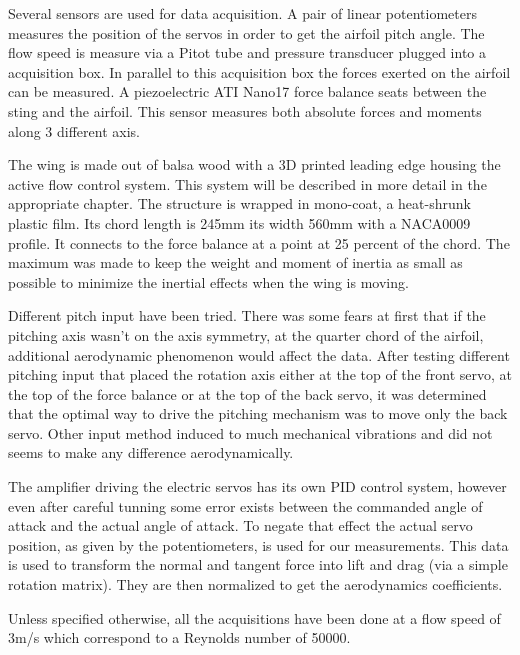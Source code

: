 \par Several sensors are used for data acquisition.
A pair of linear potentiometers measures the position of the servos in order to get the airfoil pitch angle.
The flow speed is measure via a Pitot tube and pressure transducer plugged into a acquisition box.
In parallel to this acquisition box the forces exerted on the airfoil can be measured.
A piezoelectric ATI Nano17 force balance seats between the sting and the airfoil.
This sensor measures both absolute forces and moments along 3 different axis.

\par The wing is made out of balsa wood with a 3D printed leading edge housing the active flow control system.
This system will be described in more detail in the appropriate chapter.
The structure is wrapped in mono-coat, a heat-shrunk plastic film.
Its chord length is 245mm its width 560mm with a NACA0009 profile.
It connects to the force balance at a point at 25 percent of the chord.
The maximum was made to keep the weight and moment of inertia as small as possible to minimize the inertial effects when the wing is moving.


\FloatBarrier

Different pitch input have been tried.
There was some fears at first that if the pitching axis wasn't on the axis symmetry, at the quarter chord of the airfoil, additional aerodynamic phenomenon would affect the data.
After testing different pitching input that placed the rotation axis either at the top of the front servo, at the top of the force balance or at the top of the back servo,  it was determined that the optimal way to drive the pitching mechanism was to move only the back servo.
Other input method induced to much mechanical vibrations and did not seems to make any difference aerodynamically.

\par The amplifier driving the electric servos has its own PID control system, however even after careful tunning some error exists between the commanded angle of attack and the actual angle of attack.
To negate that effect the actual servo position, as given by the potentiometers, is used for our measurements.
This data is used to transform the normal and tangent force into lift and drag (via a simple rotation matrix). 
They are then normalized to get the aerodynamics coefficients.

\par Unless specified otherwise, all the acquisitions have been done at a flow speed of 3m/s which correspond to a Reynolds number of 50000.

